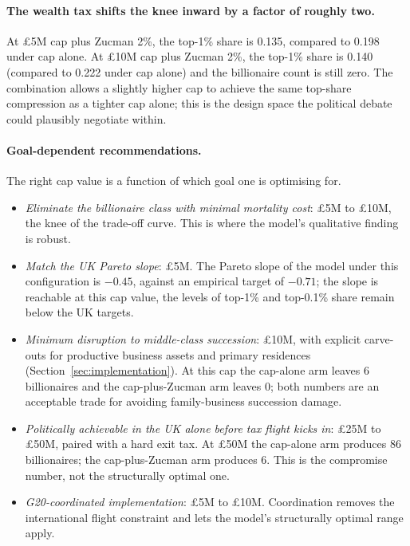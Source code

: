 \documentclass[11pt]{article}
\begin{document}
\paragraph{The wealth tax shifts the knee inward by a factor of
roughly two.}  At \pounds 5M cap plus Zucman 2\%, the top-1\% share
is 0.135, compared to 0.198 under cap alone.  At \pounds 10M cap
plus Zucman 2\%, the top-1\% share is 0.140 (compared to 0.222 under
cap alone) and the billionaire count is still zero.  The combination
allows a slightly higher cap to achieve the same top-share
compression as a tighter cap alone; this is the design space the
political debate could plausibly negotiate within.

\paragraph{Goal-dependent recommendations.}  The right cap value is
a function of which goal one is optimising for.

\begin{itemize}
\item \emph{Eliminate the billionaire class with minimal mortality
cost}: \pounds 5M to \pounds 10M, the knee of the trade-off curve.
This is where the model's qualitative finding is robust.

\item \emph{Match the UK Pareto slope}: \pounds 5M.  The Pareto
slope of the model under this configuration is $-0.45$, against
an empirical target of $-0.71$; the slope is reachable at this cap
value, the levels of top-1\% and top-0.1\% share remain below the
UK targets.

\item \emph{Minimum disruption to middle-class succession}:
\pounds 10M, with explicit carve-outs for productive business
assets and primary residences (Section~\ref{sec:implementation}).
At this cap the cap-alone arm leaves 6 billionaires and the
cap-plus-Zucman arm leaves 0; both numbers are an acceptable
trade for avoiding family-business succession damage.

\item \emph{Politically achievable in the UK alone before tax
flight kicks in}: \pounds 25M to \pounds 50M, paired with a hard
exit tax.  At \pounds 50M the cap-alone arm produces 86
billionaires; the cap-plus-Zucman arm produces 6.  This is the
compromise number, not the structurally optimal one.

\item \emph{G20-coordinated implementation}: \pounds 5M to
\pounds 10M.  Coordination removes the international flight
constraint and lets the model's structurally optimal range apply.
\end{itemize}
\end{document}
